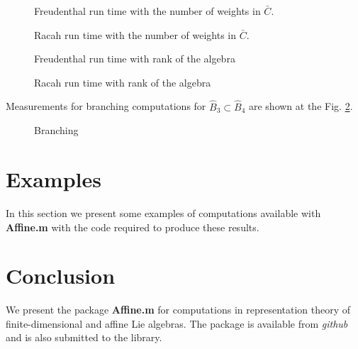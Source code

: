 \documentclass[preprint,12pt]{elsarticle}
\begin{document}
\begin{figure}[h]
  \label{freudenthal-racah-times}
  \noindent\centering{
  }
  \caption{Freudenthal run time with the number of weights in $\bar C$.}

  \noindent\centering{
  }
  \caption{Racah run time with the number of weights in $\bar C$.}

  \noindent\centering{
  }
  \caption{Freudenthal run time with rank of the algebra}

  \noindent\centering{
  }
  \caption{Racah run time with rank of the algebra}
\end{figure}

Measurements for branching computations for $\hat B_{3}\subset \hat B_{4}$ are shown at the Fig. \ref{fig:branching}.
\begin{figure}[h]
  \label{fig:branching}
  \noindent\centering{
  }
  \caption{Branching}
\end{figure}

\section{Examples}
\label{sec:examples}
In this section we present some examples of computations available with {\bf Affine.m} with the code required to produce these results. 

\section{Conclusion}
\label{sec:conclusion}
We present the package {\bf Affine.m} for computations in representation theory of finite-dimensional and affine Lie algebras. The package is available from {\it github} and is also submitted to the library. 



\end{document}
